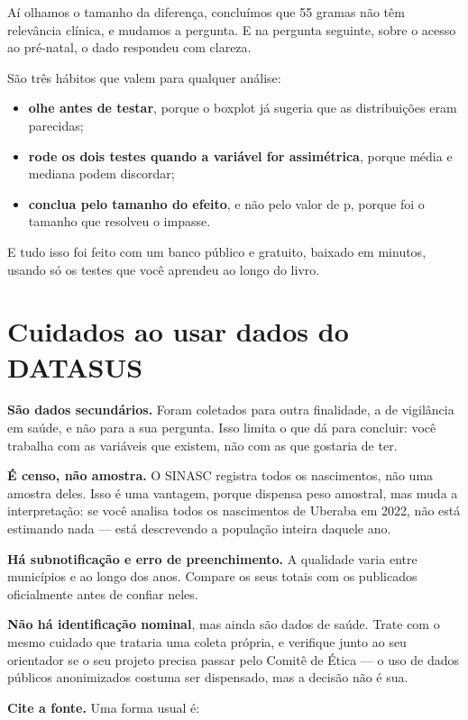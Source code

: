 \documentclass[
]{book}
\providecommand{\tightlist}{%
  \setlength{\itemsep}{0pt}\setlength{\parskip}{0pt}}
\begin{document}
Aí olhamos o tamanho da diferença, concluímos que 55 gramas não têm relevância clínica, e mudamos a pergunta. E na pergunta seguinte, sobre o acesso ao pré-natal, o dado respondeu com clareza.

São três hábitos que valem para qualquer análise:

\begin{itemize}
\tightlist
\item
  \textbf{olhe antes de testar}, porque o boxplot já sugeria que as distribuições eram parecidas;
\item
  \textbf{rode os dois testes quando a variável for assimétrica}, porque média e mediana podem discordar;
\item
  \textbf{conclua pelo tamanho do efeito}, e não pelo valor de p, porque foi o tamanho que resolveu o impasse.
\end{itemize}

E tudo isso foi feito com um banco público e gratuito, baixado em minutos, usando só os testes que você aprendeu ao longo do livro.

\section{Cuidados ao usar dados do DATASUS}\label{cuidados-ao-usar-dados-do-datasus}

\textbf{São dados secundários.} Foram coletados para outra finalidade, a de vigilância em saúde, e não para a sua pergunta. Isso limita o que dá para concluir: você trabalha com as variáveis que existem, não com as que gostaria de ter.

\textbf{É censo, não amostra.} O SINASC registra todos os nascimentos, não uma amostra deles. Isso é uma vantagem, porque dispensa peso amostral, mas muda a interpretação: se você analisa todos os nascimentos de Uberaba em 2022, não está estimando nada --- está descrevendo a população inteira daquele ano.

\textbf{Há subnotificação e erro de preenchimento.} A qualidade varia entre municípios e ao longo dos anos. Compare os seus totais com os publicados oficialmente antes de confiar neles.

\textbf{Não há identificação nominal}, mas ainda são dados de saúde. Trate com o mesmo cuidado que trataria uma coleta própria, e verifique junto ao seu orientador se o seu projeto precisa passar pelo Comitê de Ética --- o uso de dados públicos anonimizados costuma ser dispensado, mas a decisão não é sua.

\textbf{Cite a fonte.} Uma forma usual é:
\end{document}
